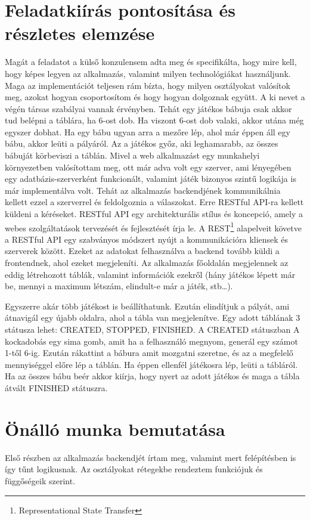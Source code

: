 \documentclass[a4paper,twoside]{article}
\begin{document}
\section{Feladatkiírás pontosítása és részletes elemzése}
Magát a feladatot a külső konzulensem adta meg és specifikálta, hogy mire kell, hogy képes
legyen az alkalmazás, valamint milyen technológiákat használjunk. Maga az implementációt
teljesen rám bízta, hogy milyen osztályokat valósítok meg, azokat hogyan csoportosítom és
hogy hogyan dolgoznak együtt.
A ki nevet a végén társas szabályai vannak érvényben. Tehát egy játékos bábuja csak akkor
tud belépni a táblára, ha 6-ost dob. Ha viszont 6-ost dob valaki, akkor utána még egyszer
dobhat. Ha egy bábu ugyan arra a mezőre lép, ahol már éppen áll egy bábu, akkor leüti a
pályáról. Az a játékos győz, aki leghamarabb, az összes bábuját körbeviszi a táblán.
Mivel a web alkalmazást egy munkahelyi környezetben valósítottam meg, ott már adva volt
egy szerver, ami lényegében egy adatbázis-szerverként funkcionált, valamint játék bizonyos
szintű logikája is már implementálva volt. Tehát az alkalmazás backendjének kommunikálnia
kellett ezzel a szerverrel és feldolgoznia a válaszokat. Erre RESTful API-ra kellett küldeni a
kéréseket. RESTful API egy architekturális stílus és koncepció, amely a webes szolgáltatások
tervezését és fejlesztését írja le. A REST\footnote{Representational State Transfer} alapelveit követve
a RESTful API egy szabványos módszert nyújt a kommunikációra kliensek és szerverek
között. Ezeket az adatokat felhasználva a backend tovább küldi a frontendnek, ahol ezeket
megjeleníti.
Az alkalmazás főoldalán megjelennek az eddig létrehozott táblák, valamint információk
ezekről (hány játékos lépett már be, mennyi a maximum létszám, elindult-e már a játék,
stb…). 

Egyszerre akár több játékost is beállíthatunk. Ezután elindítjuk a pályát, ami átnavigál egy
újabb oldalra, ahol a tábla van megjelenítve. Egy adott táblának 3 státusza lehet: CREATED,
STOPPED, FINISHED. A CREATED státuszban A kockadobás egy sima gomb, amit ha a
felhasználó megnyom, generál egy számot 1-től 6-ig. Ezután rákattint a bábura amit mozgatni
szeretne, és az a megfelelő mennyiséggel előre lép a táblán. Ha éppen ellenfél játékosra lép,
leüti a tábláról. Ha az összes bábu beér akkor kiírja, hogy nyert az adott játékos és maga a
tábla átvált FINISHED státuszra. 
\newpage

\section{Önálló munka bemutatása}
Első részben az alkalmazás backendjét írtam meg, valamint mert felépítésben is így tűnt
logikusnak. Az osztályokat rétegekbe rendeztem funkciójuk és függőségeik szerint.
\end{document}
